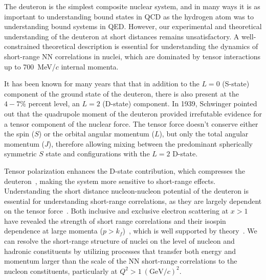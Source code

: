 
The deuteron is the simplest composite nuclear system, and in many ways it is as important to understanding bound states in QCD as the hydrogen atom was to understanding bound systems in QED.  However, our experimental and theoretical understanding of the deuteron at short distances remains unsatisfactory. A well-constrained theoretical description is essential for understanding the dynamics of short-range NN correlations in nuclei, which are dominated by tensor interactions up to 700~MeV/$c$ internal momenta.


It has been known for many years that that in addition to the $L = 0$ (S-state) component of the ground state of the deuteron, there is also present at the $4-7\%$ percent level, an $L = 2$ (D-state) component. In 1939, Schwinger pointed out that the quadrupole moment of the deuteron provided irrefutable evidence for a tensor component of the nuclear force. The tensor force doesn't conserve either the spin ($S$) or the orbital angular momentum ($L$), but only the total angular momentum ($J$), therefore allowing mixing between the predominant spherically symmetric $S$ state and configurations with the $L = 2$ D-state.


Tensor polarization enhances the D-state contribution, which compresses the deuteron~\cite{Forest:1996kp}, 
making the system more sensitive to short-range effects. 
Understanding the short distance nucleon-nucleon potential of the deuteron is essential for understanding short-range correlations, as they are largely dependent on the tensor force~\cite{Arrington:2011xs}. Both inclusive and exclusive electron scattering at $x>1$ have revealed the strength of short range correlations and their isospin dependence at large momenta ($p>k_f$)~\cite{Korover:2014dma}, which is well supported by theory~\cite{Schiavilla:2006xx}. We can resolve the short-range structure of nuclei on the level of nucleon and hadronic constituents by utilizing processes that transfer both energy and momentum larger than the scale of the NN short-range correlations to the nucleon constituents, particularly at $Q^2>1~(\mathrm{GeV}/c)^2$.





